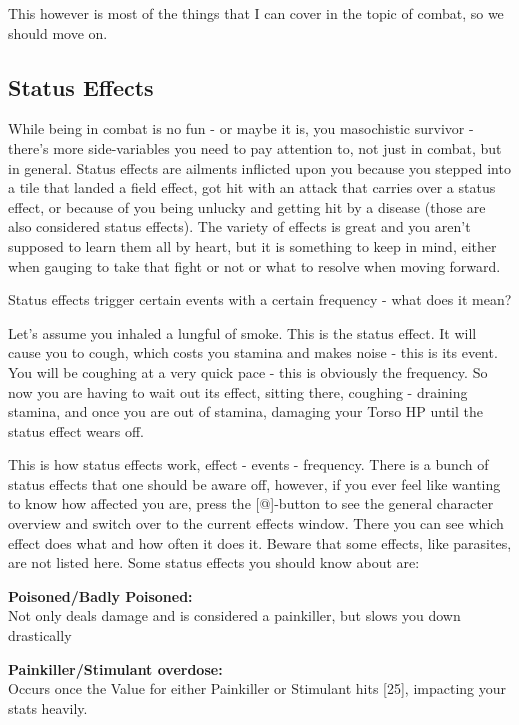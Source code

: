 This however is most of the things that I can cover in the topic of combat, so we should move on.

\subsection{Status Effects}

While being in combat is no fun - or maybe it is, you masochistic survivor - there's more side-variables you need to pay attention to, not just in combat, but in general. Status effects are ailments inflicted upon you because you stepped into a tile that landed a field effect, got hit with an attack that carries over a status effect, or because of you being unlucky and getting hit by a disease (those are also considered status effects). The variety of effects is great and you aren't supposed to learn them all by heart, but it is something to keep in mind, either when gauging to take that fight or not or what to resolve when moving forward.

Status effects trigger certain events with a certain frequency - what does it mean?

Let's assume you inhaled a lungful of smoke. This is the status effect. It will cause you to cough, which costs you stamina and makes noise - this is its event. You will be coughing at a very quick pace - this is obviously the frequency. So now you are having to wait out its effect, sitting there, coughing - draining stamina, and once you are out of stamina, damaging your Torso HP until the status effect wears off.

This is how status effects work, effect - events - frequency. There is a bunch of status effects that one should be aware off, however, if you ever feel like wanting to know how affected you are, press the [@]-button to see the general character overview and switch over to the current effects window. There you can see which effect does what and how often it does it. Beware that some effects, like parasites, are not listed here. Some status effects you should know about are:

\textbf{Poisoned/Badly Poisoned:}\\Not only deals damage and is considered a painkiller, but slows you down drastically

\textbf{Painkiller/Stimulant overdose:}\\Occurs once the Value for either Painkiller or Stimulant hits [25], impacting your stats heavily.

